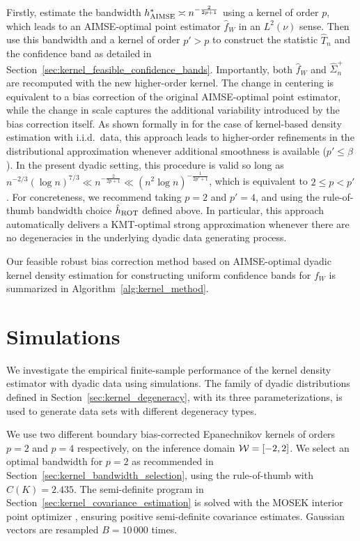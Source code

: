 Firstly, estimate the bandwidth $h^*_{\operatorname{AIMSE}}\asymp n^{-\frac{2}{2p+1}}$ using a
kernel of order $p$, which leads to an AIMSE-optimal point estimator
$\hat{f}_W$ in an $L^2(\nu)$ sense. Then use this bandwidth and a kernel of
order $p' > p$ to construct the statistic $\hat T_n$ and the confidence band as
detailed in Section~\ref{sec:kernel_feasible_confidence_bands}. Importantly,
both
$\hat{f}_W$ and $\hat{\Sigma}^+_n$ are recomputed with the new higher-order
kernel. The change in centering is equivalent to a bias correction of the
original AIMSE-optimal point estimator, while the change in scale captures the
additional variability introduced by the bias correction itself. As shown
formally in \citet{calonico2018effect, calonico2022coverage} for the case of
kernel-based density
estimation with i.i.d.\ data, this approach leads to higher-order refinements
in the distributional approximation whenever additional smoothness is available
($p'\leq\beta$). In the present dyadic setting, this procedure is valid so long
as $n^{-2/3} (\log n)^{7/3} \ll n^{-\frac{2}{2p+1}}
\ll (n^2 \log n)^{-\frac{1}{2p' + 1}}$,
which is equivalent to $2 \leq p < p'$.
For concreteness, we recommend taking $p = 2$ and $p' = 4$,
and using the rule-of-thumb bandwidth choice $\hat{h}_{\operatorname{ROT}}$ defined above.
In particular, this approach automatically delivers a KMT-optimal
strong approximation whenever there are no degeneracies in the
underlying dyadic data generating process.

Our feasible robust bias correction method based on AIMSE-optimal dyadic
kernel density estimation for constructing uniform confidence bands
for $f_W$ is summarized in Algorithm~\ref{alg:kernel_method}.

\section{Simulations}
\label{sec:kernel_simulations}

We investigate the empirical finite-sample performance of the kernel density
estimator with dyadic data using simulations. The family of dyadic
distributions defined in Section~\ref{sec:kernel_degeneracy}, with its three
parameterizations, is used to generate data sets with different degeneracy
types.

We use two different boundary bias-corrected Epanechnikov kernels of orders
$p=2$ and $p=4$ respectively, on the inference domain $\mathcal{W} = [-2,2]$. We select
an optimal bandwidth for $p=2$ as recommended in
Section~\ref{sec:kernel_bandwidth_selection}, using the rule-of-thumb with
$C(K) = 2.435$. The semi-definite program in
Section~\ref{sec:kernel_covariance_estimation} is solved with the MOSEK
interior point
optimizer \citep{mosek}, ensuring positive semi-definite covariance estimates.
Gaussian vectors are resampled $B = 10\,000$ times.

